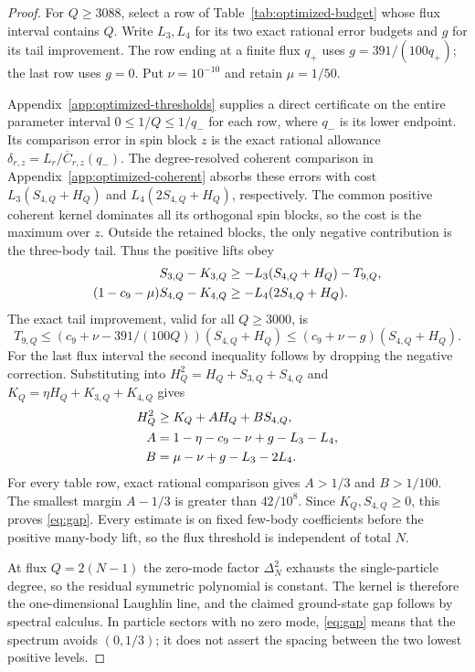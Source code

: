 \documentclass[11pt]{article}
\begin{document}
\begin{proof}
For $Q\ge3088$, select a row of Table~\ref{tab:optimized-budget}
whose flux interval contains $Q$. Write $L_3,L_4$ for its two exact
rational error budgets and $g$ for its tail improvement. The row ending
at a finite flux $q_+$ uses $g=391/(100q_+)$; the last row uses $g=0$.
Put $\nu=10^{-10}$ and retain $\mu=1/50$.

Appendix~\ref{app:optimized-thresholds} supplies a direct certificate on
the entire parameter interval $0\le1/Q\le1/q_-$ for each row, where $q_-$
is its lower endpoint. Its comparison error in spin block $z$ is the exact
rational allowance $\delta_{r,z}=L_r/\overline C_{r,z}(q_-)$.
The degree-resolved coherent comparison in
Appendix~\ref{app:optimized-coherent} absorbs these errors with cost
$L_3(S_{4,Q}+H_Q)$ and $L_4(2S_{4,Q}+H_Q)$, respectively.
The common positive coherent kernel dominates all its orthogonal spin
blocks, so the cost is the maximum over $z$. Outside the retained blocks, the only negative contribution
is the three-body tail. Thus the positive lifts obey
\begin{align}
 S_{3,Q}-K_{3,Q}&\ge-L_3(S_{4,Q}+H_Q)-T_{9,Q},\notag\\
 (1-c_9-\mu)S_{4,Q}-K_{4,Q}&\ge-L_4(2S_{4,Q}+H_Q).
\end{align}
The exact tail improvement, valid for all $Q\ge3000$, is
\begin{equation}
 T_{9,Q}\le(c_9+\nu-391/(100Q))(S_{4,Q}+H_Q)
          \le(c_9+\nu-g)(S_{4,Q}+H_Q).
\end{equation}
For the last flux interval the second inequality follows by dropping the
negative correction. Substituting into $H_Q^2=H_Q+S_{3,Q}+S_{4,Q}$ and
$K_Q=\eta H_Q+K_{3,Q}+K_{4,Q}$ gives
\begin{align}
 H_Q^2&\ge K_Q+A H_Q+B S_{4,Q},\label{eq:finalbudget}\\
 A&=1-\eta-c_9-\nu+g-L_3-L_4,\notag\\
 B&=\mu-\nu+g-L_3-2L_4.\notag
\end{align}
For every table row, exact rational comparison gives $A>1/3$ and
$B>1/100$. The smallest margin $A-1/3$ is greater than
$42/10^8$. Since $K_Q,S_{4,Q}\ge0$, this proves \eqref{eq:gap}.
Every estimate is on fixed few-body coefficients before the positive
many-body lift, so the flux threshold is independent of total $N$.

At flux $Q=2(N-1)$ the zero-mode factor $\Delta_N^2$ exhausts the
single-particle degree, so the residual symmetric polynomial is constant.
The kernel is therefore the one-dimensional Laughlin line, and the claimed
ground-state gap follows by spectral calculus. In particle sectors with
no zero mode, \eqref{eq:gap} means that the spectrum avoids $(0,1/3)$;
it does not assert the spacing between the two lowest positive levels.


\end{proof}
\end{document}
